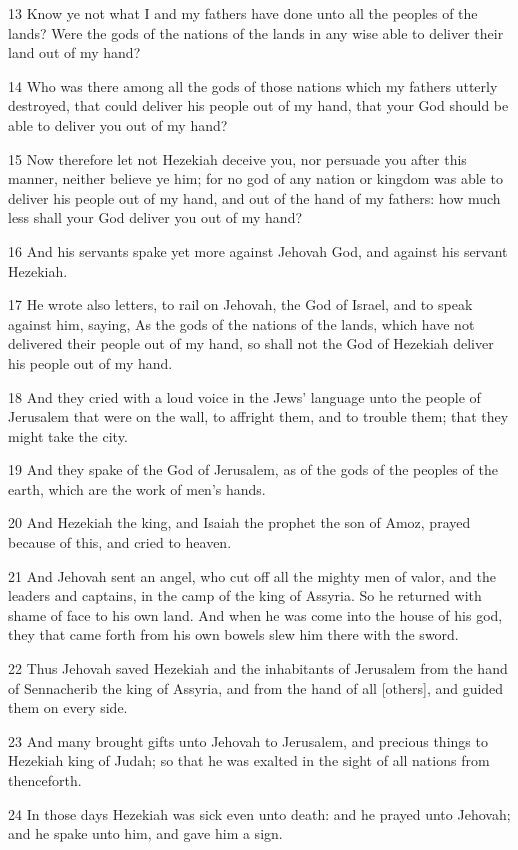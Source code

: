 \par 13 Know ye not what I and my fathers have done unto all the peoples of the lands? Were the gods of the nations of the lands in any wise able to deliver their land out of my hand?
\par 14 Who was there among all the gods of those nations which my fathers utterly destroyed, that could deliver his people out of my hand, that your God should be able to deliver you out of my hand?
\par 15 Now therefore let not Hezekiah deceive you, nor persuade you after this manner, neither believe ye him; for no god of any nation or kingdom was able to deliver his people out of my hand, and out of the hand of my fathers: how much less shall your God deliver you out of my hand?
\par 16 And his servants spake yet more against Jehovah God, and against his servant Hezekiah.
\par 17 He wrote also letters, to rail on Jehovah, the God of Israel, and to speak against him, saying, As the gods of the nations of the lands, which have not delivered their people out of my hand, so shall not the God of Hezekiah deliver his people out of my hand.
\par 18 And they cried with a loud voice in the Jews' language unto the people of Jerusalem that were on the wall, to affright them, and to trouble them; that they might take the city.
\par 19 And they spake of the God of Jerusalem, as of the gods of the peoples of the earth, which are the work of men's hands.
\par 20 And Hezekiah the king, and Isaiah the prophet the son of Amoz, prayed because of this, and cried to heaven.
\par 21 And Jehovah sent an angel, who cut off all the mighty men of valor, and the leaders and captains, in the camp of the king of Assyria. So he returned with shame of face to his own land. And when he was come into the house of his god, they that came forth from his own bowels slew him there with the sword.
\par 22 Thus Jehovah saved Hezekiah and the inhabitants of Jerusalem from the hand of Sennacherib the king of Assyria, and from the hand of all [others], and guided them on every side.
\par 23 And many brought gifts unto Jehovah to Jerusalem, and precious things to Hezekiah king of Judah; so that he was exalted in the sight of all nations from thenceforth.
\par 24 In those days Hezekiah was sick even unto death: and he prayed unto Jehovah; and he spake unto him, and gave him a sign.

